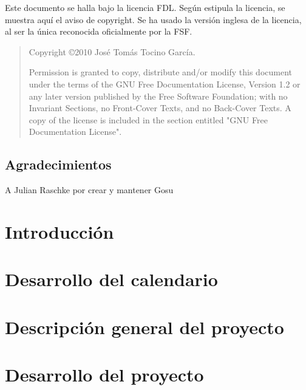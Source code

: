 \documentclass[a4paper,12pt]{scrbook}
\begin{document}




\cleardoublepage



\cleardoublepage
\bigskip
\bigskip

Este documento se halla bajo la licencia \ac{FDL}. Según estipula la
licencia, se muestra aquí el aviso de copyright. Se ha usado la
versión inglesa de la licencia, al ser la única reconocida
oficialmente por la \ac{FSF}.

\begin{quote}
  Copyright \copyright  2010 José Tomás Tocino García.
  
  Permission is granted to copy, distribute and/or modify this document
  under the terms of the GNU Free Documentation License, Version 1.2
  or any later version published by the Free Software Foundation;
  with no Invariant Sections, no Front-Cover Texts, and no Back-Cover Texts.
  A copy of the license is included in the section entitled "GNU
  Free Documentation License".
\end{quote}

\cleardoublepage

\section*{Agradecimientos}

A Julian Raschke por crear y mantener Gosu

\cleardoublepage

\tableofcontents
\listoffigures
\listoftables

\chapter{Introducción}


\chapter{Desarrollo del calendario}

 
\chapter{Descripción general del proyecto}

 
\chapter{Desarrollo del proyecto}

\end{document}
